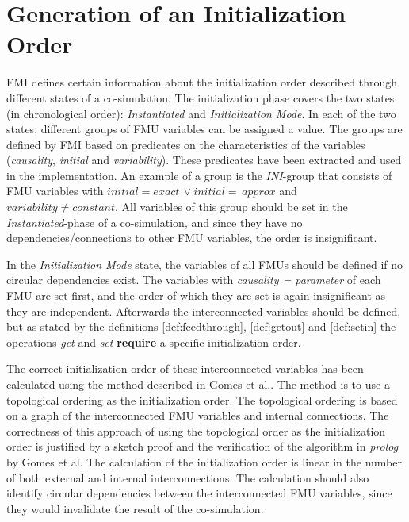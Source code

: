 \documentclass[runningheads]{llncs}
\begin{document}
\section{Generation of an Initialization Order}\label{sc:initilization}
FMI defines certain information about the initialization order described through different states of a co-simulation. The initialization phase covers the two states (in chronological order): \textit{Instantiated} and \textit{Initialization Mode}.
In each of the two states, different groups of FMU variables can be assigned a value. The groups are defined by FMI based on predicates on the characteristics of the variables (\textit{causality}, \textit{initial} and \textit{variability}). These predicates have been extracted and used in the implementation. 
An example of a group is the \textit{INI}-group that consists of FMU variables with $initial = exact\, \lor initial = \,approx $  and $variability \neq constant$. All variables of this group should be set in the \textit{Instantiated}-phase of a co-simulation, and since they have no dependencies/connections to other FMU variables, the order is insignificant. 

In the \textit{Initialization Mode} state, the variables of all FMUs should be defined if no circular dependencies exist. 
The variables with \textit{causality = parameter} of each FMU are set first, and the order of which they are set is again insignificant as they are independent.
Afterwards the interconnected variables should be defined, but as stated by the definitions \ref{def:feedthrough}, \ref{def:getout} and \ref{def:setin} the operations \textit{get} and \textit{set} \textbf{require} a specific initialization order. 

The correct initialization order of these interconnected variables has been calculated using the method described in Gomes et al.\cite{Gomes2019b}. The method is to use a topological ordering as the initialization order. The topological ordering is based on a graph of the interconnected FMU variables and internal connections. The correctness of this approach of using the topological order as the initialization order is justified by a sketch proof and the verification of the algorithm in \textit{prolog} by Gomes et al.
The calculation of the initialization order is linear in the number of both external and internal interconnections. The calculation should also identify circular dependencies between the interconnected FMU variables, since they would invalidate the result of the co-simulation.
\end{document}
